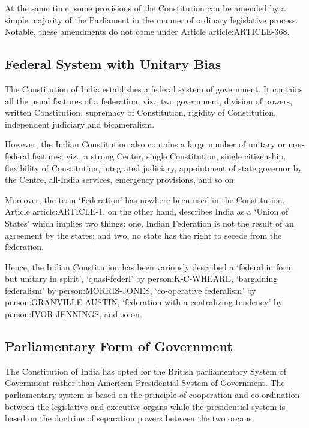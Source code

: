 \begin{multicols}{2}
At the same time, some provisions of the Constitution can be amended by a simple majority of the Parliament in the manner of ordinary legislative process. Notable, these amendments do not come under Article \gls{article:ARTICLE-368}.

\subsection{Federal System with Unitary Bias}

The Constitution of India establishes a federal system of government. It contains all the usual features of a federation, viz., two government, division of powers, written Constitution, supremacy of Constitution, rigidity of Constitution, independent judiciary and bicameralism.

However, the Indian Constitution also contains a large number of unitary or non-federal features, viz., a strong Center, single Constitution, single citizenship, flexibility of Constitution, integrated judiciary, appointment of state governor by the Centre, all-India services, emergency provisions, and so on.

Moreover, the term `Federation' has nowhere been used in the Constitution. Article \gls{article:ARTICLE-1}, on the other hand, describes India as a `Union of States' which implies two things: one, Indian Federation is not the result of an agreement by the states; and two, no state has the right to secede from the federation.

Hence, the Indian Constitution has been variously described a `federal in form but unitary in spirit', `quasi-federl' by \gls{person:K-C-WHEARE}, `bargaining federalism' by \gls{person:MORRIS-JONES}, `co-operative federalism' by \gls{person:GRANVILLE-AUSTIN}, `federation with a centralizing tendency' by \gls{person:IVOR-JENNINGS}, and so on.

\subsection{Parliamentary Form of Government}

The Constitution of India has opted for the British parliamentary System of Government rather than American Presidential System of Government. The parliamentary system is based on the principle of cooperation and co-ordination between the legislative and executive organs while the presidential system is based on the doctrine of separation powers between the two organs.


\end{multicols}
